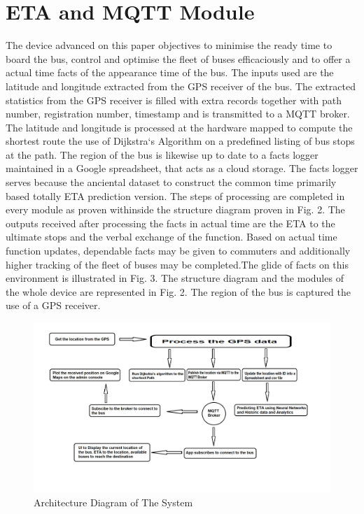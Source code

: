 \section{ETA and MQTT Module }

The device advanced on this paper objectives to minimise the ready time to board the bus, control and optimise the fleet of buses efficaciously and to offer a actual time facts of the appearance time of the bus. The inputs used are the latitude and longitude extracted from the GPS receiver of the bus. The extracted statistics from the GPS receiver is filled with extra records together with path number, registration number, timestamp and is transmitted to a MQTT broker. The latitude and longitude is processed at the hardware mapped to compute the shortest route the use of Dijkstra`s Algorithm on a predefined listing of bus stops at the path. The region of the bus is likewise up to date to a facts logger maintained in a Google spreadsheet, that acts as a cloud storage. The facts logger serves because the anciental dataset to construct the common time primarily based totally ETA prediction version. The steps of processing are completed in every module as proven withinside the structure diagram proven in Fig. 2. The outputs received after processing the facts in actual time are the ETA to the ultimate stops and the verbal exchange of the function. Based on actual time function updates, dependable facts may be given to commuters and additionally higher tracking of the fleet of buses may be completed.The glide of facts on this environment is illustrated in Fig. 3. The structure diagram and the modules of the whole device are represented in Fig. 2. The region of the bus is captured the use of a GPS receiver.

\begin{figure}
\centering
\includegraphics[width=1\textwidth]{Architecture Diagram of The System.jpg}
\caption{Architecture Diagram of The System}
\end{figure}

